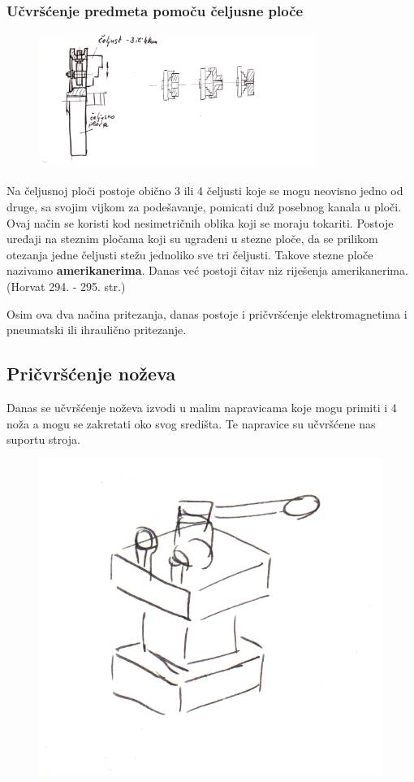 \documentclass[a4paper,12pt]{article}
\numberwithin{figure}{section}
\begin{document}
\subsubsection{Učvršćenje predmeta pomoču čeljusne ploče}
\begin{figure}[!h]
\centering
\includegraphics[width=0.8\textwidth]{image_19-1.png}
\end{figure}
\FloatBarrier
Na čeljusnoj ploči postoje obično 3 ili 4 čeljusti koje se mogu neovisno jedno od druge, sa svojim vijkom za podešavanje, pomicati duž posebnog kanala u ploči. Ovaj način se koristi kod nesimetričnih oblika koji se moraju tokariti. Postoje uređaji na steznim pločama koji su ugrađeni u stezne ploče, da se prilikom otezanja  jedne čeljusti stežu jednoliko sve tri čeljusti. Takove stezne ploče nazivamo \textbf{amerikanerima}. Danas već postoji čitav niz riješenja amerikanerima. (Horvat 294. - 295. str.)\par
Osim ova dva načina pritezanja, danas postoje i pričvršćenje elektromagnetima i pneumatski ili ihraulično pritezanje.
\subsection{Pričvršćenje noževa}
Danas se učvršćenje noževa izvodi u malim napravicama koje mogu primiti i 4 noža a mogu se zakretati oko svog središta. Te napravice su učvršćene nas suportu stroja.
\begin{figure}[!h]
\centering
\includegraphics[scale=0.1]{image_19-2.png}
\end{figure}
\FloatBarrier
\end{document}
